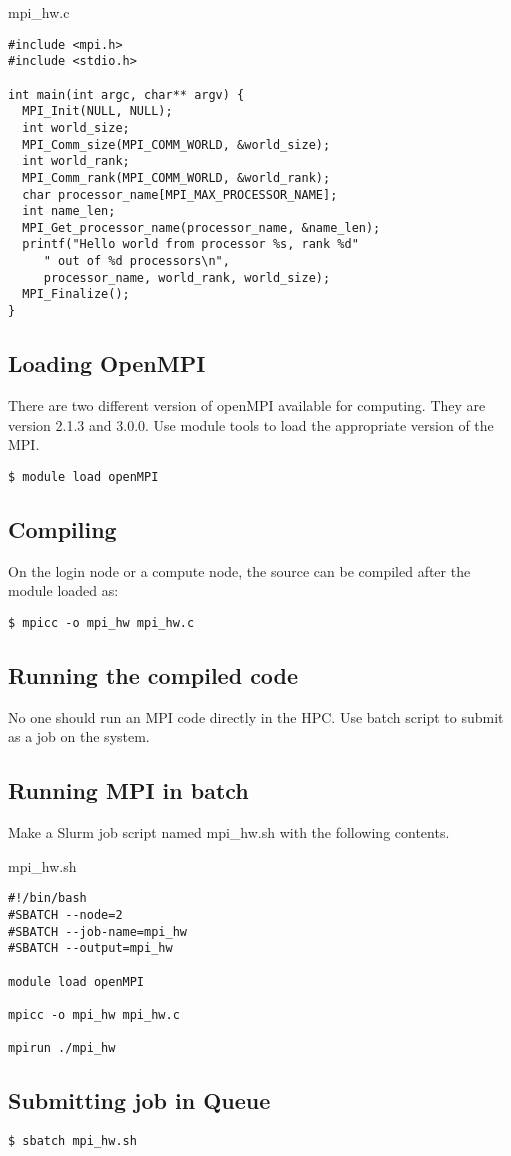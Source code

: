 \documentclass[11pt]{article}
\numberwithin{figure}{section}
\begin{document}
mpi\_hw.c

\begin{lstlisting}[frame=single]
#include <mpi.h>
#include <stdio.h>
 
int main(int argc, char** argv) {
  MPI_Init(NULL, NULL);
  int world_size;
  MPI_Comm_size(MPI_COMM_WORLD, &world_size);
  int world_rank;
  MPI_Comm_rank(MPI_COMM_WORLD, &world_rank);
  char processor_name[MPI_MAX_PROCESSOR_NAME];
  int name_len;
  MPI_Get_processor_name(processor_name, &name_len);
  printf("Hello world from processor %s, rank %d"
     " out of %d processors\n",
     processor_name, world_rank, world_size);
  MPI_Finalize();
}
\end{lstlisting}

\subsection{Loading OpenMPI}
There are two different version of openMPI available for computing. They are
version 2.1.3 and 3.0.0. Use module tools to load the appropriate version of
the MPI.

\begin{lstlisting}[frame=single]
$ module load openMPI
\end{lstlisting}

\subsection{Compiling}
On the login node or a compute node, the source can be compiled after the
module loaded as:

\begin{lstlisting}[frame=single]
$ mpicc -o mpi_hw mpi_hw.c
\end{lstlisting}

\subsection{Running the compiled code}
No one should run an MPI code directly in the HPC. Use batch script to submit
as a job on the system.

\subsection{Running MPI in batch}
Make a Slurm job script named mpi\_hw.sh with the following contents.

mpi\_hw.sh

\begin{lstlisting}[frame=single]
#!/bin/bash
#SBATCH --node=2
#SBATCH --job-name=mpi_hw
#SBATCH --output=mpi_hw

module load openMPI

mpicc -o mpi_hw mpi_hw.c

mpirun ./mpi_hw
\end{lstlisting}


\subsection{Submitting job in Queue}

\begin{lstlisting}[frame=single]
$ sbatch mpi_hw.sh
\end{lstlisting}
\end{document}
